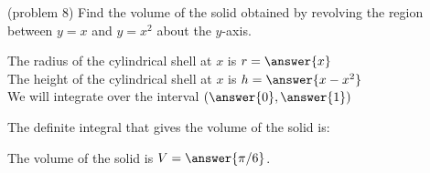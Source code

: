 \documentclass[handout]{ximera}
\begin{document}
\begin{problem}(problem 8)
Find the volume of the solid obtained by revolving the region between $y= x$ and $y=x^2$ about the $y$-axis.


The radius of the cylindrical shell at $x$ is $r = \answer{x}$\\
The height of the cylindrical shell at $x$ is $h = \answer{x-x^2}$\\

We will integrate over the interval $\left(\answer{0},\answer{1}\right)$

The definite integral that gives the volume of the solid is:\\
\begin{multipleChoice}
\end{multipleChoice}

The volume of the solid is $V = \answer{\pi/6 }$.

\end{problem}
\end{document}
